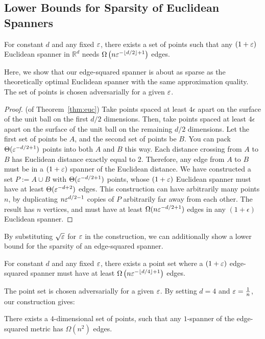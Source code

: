 \subsection{Lower Bounds for Sparsity of Euclidean
Spanners}\label{sec:lower-bound}
\begin{theorem} \label{thm:euc} For constant $d$ and any fixed $\varepsilon$, there exists a set
of points such that any $(1+\varepsilon)$ Euclidean spanner in $\mathbb{R}^d$
  needs $\Omega\left(n
  \varepsilon^{-\lfloor d/2\rfloor + 1}\right)$ edges.
\end{theorem}
Here, we show that our edge-squared spanner is about as sparse as the
theoretically optimal Euclidean spanner with the same
approximation quality. 
The set of points is chosen adversarially for a given $\varepsilon$.

\begin{proof} (of Theorem~\ref{thm:euc})
Take points spaced at least $4\epsilon$
apart on the surface of the unit ball on the first $d/2$ dimensions.
Then,
take points spaced at least $4\epsilon$ apart on the surface of the unit
ball on the remaining
$d/2$ dimensions. Let the first
set of points be $A$, and the second set of points be $B$.  
You can pack $\Theta(\varepsilon^{-d/2+1})$ points into both $A$ and
$B$ this way.
Each distance crossing from $A$ to $B$ has Euclidean distance exactly equal to $2$.
Therefore, any edge from $A$ to $B$ must be in a
$(1+\varepsilon)$ spanner of the Euclidean distance. We have constructed
a set $P := A \cup B$ with $\Theta(\varepsilon^{-d/2+1})$ points, whose $(1+\varepsilon)$ Euclidean spanner must have at
least $\Theta(\varepsilon^{-d+2})$ edges.
This construction can have arbitrarily many points $n$, by
  duplicating $n \varepsilon^{d/2-1}$
copies of $P$ arbitrarily far away from each other. The
  result has $n$ vertices, and must have at least $\Omega(n \varepsilon^{-d/2+1})$ edges in
any $(1+\epsilon)$ Euclidean spanner.  
\end{proof}
By substituting $\sqrt{\varepsilon}$ for $\varepsilon$ in the construction, we
can additionally show a lower bound for the sparsity of an
edge-squared spanner.

\begin{lemma} For constant $d$ and any fixed $\varepsilon$, there exists a point set
where a $(1+\varepsilon)$
edge-squared spanner must have at least $\Omega\left(n\varepsilon^{-\lfloor d/4\rfloor+1}\right)$
edges. 
\end{lemma}
The point set is chosen adversarially for a given $\varepsilon$.  
By setting $d=4$ and $\varepsilon = \frac{1}{n}$, our construction gives:
\begin{lemma}\label{lem:n-squared}
There exists a 
$4$-dimensional set of points, such that any $1$-spanner of the
  edge-squared metric has $\Omega(n^2)$ 
edges.
\end{lemma}

